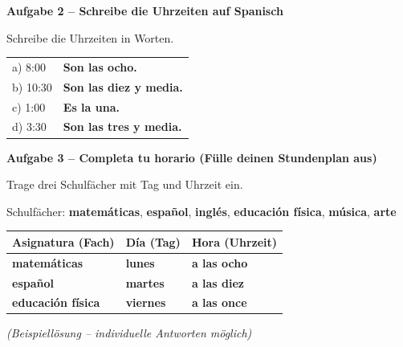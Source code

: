 \documentclass[11pt, a4paper]{article}
\newcommand{\fachfarbe}{spanisch}
\newcommand{\punktebox}[1]{\hfill\fbox{\small \_/#1}}
\newcommand{\lsg}[1]{\textcolor{loesung}{\textbf{#1}}}
\newenvironment{aufgabe}[1]{%
    \needspace{5\baselineskip}%
    \nopagebreak[4]%
    \vspace{10pt}
    \noindent\textbf{\textcolor{\fachfarbe}{Aufgabe #1}}
    \nopagebreak[4]%
    \vspace{5pt}
    \nopagebreak[4]%
    \begin{list}{}{\leftmargin=0pt}
    \item[]
}{%
    \end{list}
}
\newcommand{\es}[1]{\textcolor{\fachfarbe}{\textbf{#1}}}
\begin{document}
\begin{aufgabe}{2 -- Schreibe die Uhrzeiten auf Spanisch}
Schreibe die Uhrzeiten in Worten. \punktebox{4}
\end{aufgabe}

\noindent
\begin{tabular}{p{3cm}p{10cm}}
a) 8:00 & \lsg{Son las ocho.} \\[1em]
b) 10:30 & \lsg{Son las diez y media.} \\[1em]
c) 1:00 & \lsg{Es la una.} \\[1em]
d) 3:30 & \lsg{Son las tres y media.} \\
\end{tabular}

\vspace{15pt}


\begin{aufgabe}{3 -- Completa tu horario (Fülle deinen Stundenplan aus)}
Trage drei Schulfächer mit Tag und Uhrzeit ein. \punktebox{6}
\end{aufgabe}

\begin{hinweis}
Schulfächer: \es{matemáticas}, \es{español}, \es{inglés}, \es{educación física}, \es{música}, \es{arte}
\end{hinweis}

\vspace{0.5em}

\noindent
\begin{tabularx}{\textwidth}{|X|X|X|}
\hline
\textbf{Asignatura (Fach)} & \textbf{Día (Tag)} & \textbf{Hora (Uhrzeit)} \\
\hline
\lsg{matemáticas} & \lsg{lunes} & \lsg{a las ocho} \\[0.5em]
\hline
\lsg{español} & \lsg{martes} & \lsg{a las diez} \\[0.5em]
\hline
\lsg{educación física} & \lsg{viernes} & \lsg{a las once} \\[0.5em]
\hline
\end{tabularx}

\textit{(Beispiellösung -- individuelle Antworten möglich)}

\vspace{15pt}

\end{document}
